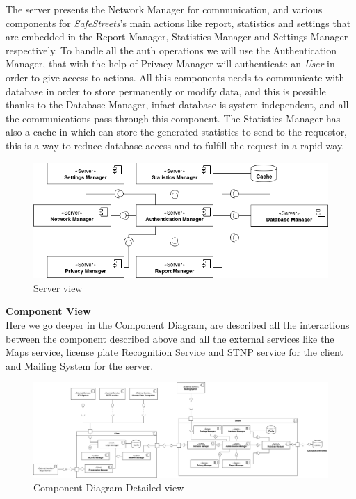 \documentclass{article}
\begin{document}
The server presents the Network Manager for communication, and various components for \textit{SafeStreets}'s main actions
like report, statistics and settings that are embedded in the Report Manager, Statistics Manager and Settings
Manager respectively. To handle all the auth operations we will use the Authentication Manager, that with the 
help of Privacy Manager will authenticate an \textit{User} in order to give access to actions. All this components needs 
to communicate with database in order to store permanently or modify data, and this is possible thanks to 
the Database Manager, infact database is system-independent, and all the communications pass through this 
component. The Statistics Manager has also a cache in which can store the generated statistics to send to the
requestor, this is a way to reduce database access and to fulfill the request in a rapid way.  
\begin{figure}[H]
    \centering
    \includegraphics[scale=0.6]{img/component_diagrams/server_component.png}
    \caption{Server view}
\end{figure}
\textbf{Component View}\\
Here we go deeper in the Component Diagram, are described all the interactions between the component
described above and all the external services like the Maps service, license plate Recognition Service and 
STNP service for the client and Mailing System for the server.

\begin{figure}[H]
    \includegraphics[width=1.2\textwidth, left]{img/component_diagrams/component_diagram_complete.png}
    \caption{Component Diagram Detailed view}
\end{figure}
\end{document}
